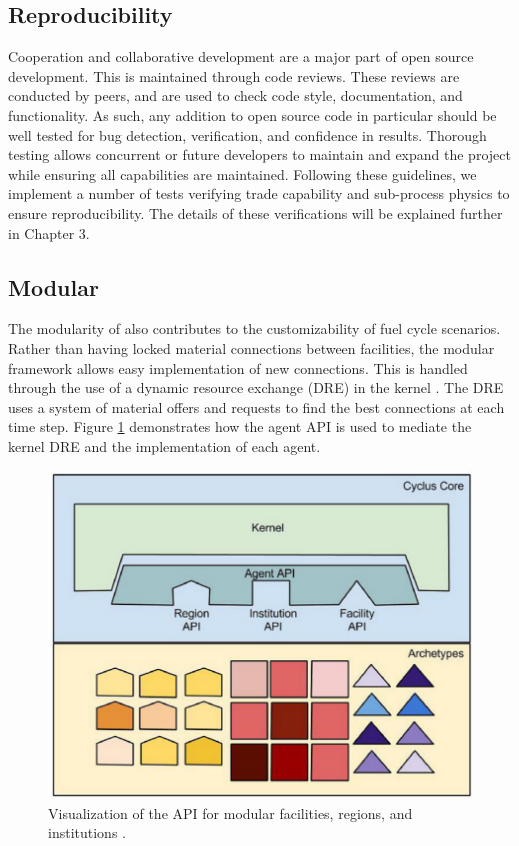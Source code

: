 \subsection{Reproducibility}
Cooperation and collaborative development are a major part of open source development. This is maintained through code reviews. These reviews are conducted by peers,
and are used to check code style, documentation, and functionality. As such, any addition to open source code in particular should be well tested for bug detection, verification, and confidence in results.
Thorough testing allows concurrent or future developers to maintain and expand the project while ensuring all capabilities are maintained. Following these guidelines, we
implement a number of tests verifying trade capability and sub-process physics to ensure reproducibility. The details of these verifications will be explained further in Chapter 3.

\subsection{Modular}

The modularity of \Cyclus also contributes to the customizability of fuel cycle scenarios. Rather than having locked material connections between facilities, the modular
\Cyclus framework allows easy implementation of new connections. This is handled through the use of a dynamic resource exchange (DRE) in the \Cyclus kernel \cite{gidden_agent-based_2015}. 
The DRE uses a system of material offers and requests to find the best connections at each time step. Figure \ref{fig:cyc-api} demonstrates how the agent API is used to mediate
the \Cyclus kernel DRE and the implementation of each agent.  

\begin{figure}
	\centering
	\includegraphics[width=0.7\linewidth]{images/cyclus-core}
	\caption{Visualization of the \Cyclus API for modular facilities, regions, and institutions \cite{huff_fundamental_2016}.}
	\label{fig:cyc-api}
\end{figure}

